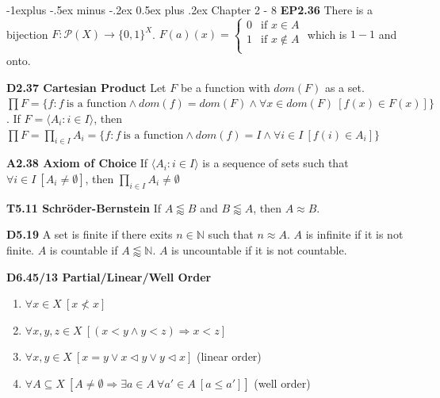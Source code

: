 \documentclass[10pt, landscape]{article}
\makeatletter
\renewcommand{\section}{\@startsection{section}{1}{0mm}%
                                {-1ex plus -.5ex minus -.2ex}%
                                {0.5ex plus .2ex}%
                                {\normalfont\large\bfseries}}
\renewcommand{\section}{\@startsection{section}{2}{0mm}%
                                {-1explus -.5ex minus -.2ex}%
                                {0.5ex plus .2ex}%
                                {\normalfont\normalsize\bfseries}}
\makeatother
\begin{document}
\raggedright
\footnotesize
\begin{multicols*}{3}

\setlength{\columnseprule}{0.25pt}
\setlength{\premulticols}{1pt}
\setlength{\postmulticols}{1pt}
\setlength{\multicolsep}{1pt}
\setlength{\columnsep}{2pt}

\begin{center}
\end{center}

\section{Chapter 2 - 8}
\textbf{EP2.36} There is a bijection $F:\mathcal{P}(X)\rightarrow \{0,1\}^X$. 
$F(a)(x) =
    \left\{
    \begin{array}{lr}
      0 & \text{if $x \in A$} \\
      1 & \text{if $x \notin A$} \\
    \end{array}
    \right.
$ which is $1-1$ and onto.

\textbf{D2.37 Cartesian Product} Let $F$ be a function with $dom(F)$ as a set. $\prod F=\{f:f \ \text{is a function} \land dom(f) = dom(F) \land \forall x \in dom(F) \ [f(x) \in F(x)]\}$. If $F=\langle A_i : i \in I \rangle$, then $\prod F = \prod_{i \in I}A_i = \{f: f \ \text{is a function} \land dom(f)=I \land \forall i \in I\ [f(i) \in A_i]\}$

\textbf{A2.38 Axiom of Choice} If $\langle A_i : i \in I \rangle$ is a sequence of sets such that $\forall i \in I \ [A_i \neq \emptyset]$, then $\prod_{i \in I} A_i \neq \emptyset$

\textbf{T5.11 Schröder-Bernstein} If $A \lessapprox B$ and $B \lessapprox A$, then $A \approx B$.

\textbf{D5.19} A set is finite if there exits $n \in \mathbb{N}$ such that $n \approx A$. $A$ is infinite if it is not finite. $A$ is countable if $A \lessapprox \mathbb{N}$. $A$ is uncountable if it is not countable.

\textbf{D6.45/13 Partial/Linear/Well Order}
\begin{enumerate}
    \item $\forall x \in X \ [x \not < x]$
    \item $\forall x, y, z \in X \ [(x < y \land y < z) \Rightarrow x < z]$
    \item $\forall x, y \in X \ [x = y \lor x \lhd y \lor y \lhd x]$ (linear order)
    \item $\forall A \subseteq X \ [A \neq \emptyset \Rightarrow \exists a \in A \ \forall a' \in A \ [a \leq a']]$ (well order)
\end{enumerate}


\end{multicols*}
\end{document}
